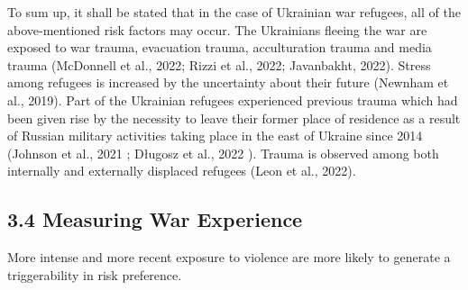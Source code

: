 \documentclass[
  letterpaper,
  DIV=11,
  numbers=noendperiod]{scrartcl}
\begin{document}
To sum up, it shall be stated that in the case of Ukrainian war
refugees, all of the above-mentioned risk factors may occur. The
Ukrainians fleeing the war are exposed to war trauma, evacuation trauma,
acculturation trauma and media trauma (McDonnell et al., 2022; Rizzi et
al., 2022; Javanbakht, 2022). Stress among refugees is increased by the
uncertainty about their future (Newnham et al., 2019). Part of the
Ukrainian refugees experienced previous trauma which had been given rise
by the necessity to leave their former place of residence as a result of
Russian military activities taking place in the east of Ukraine since
2014 (Johnson et al., 2021 ; Długosz et al., 2022 ). Trauma is observed
among both internally and externally displaced refugees (Leon et al.,
2022).

\hypertarget{measuring-war-experience}{%
\subsection{3.4 Measuring War
Experience}\label{measuring-war-experience}}

More intense and more recent exposure to violence are more likely to
generate a triggerability in risk preference.
\end{document}
